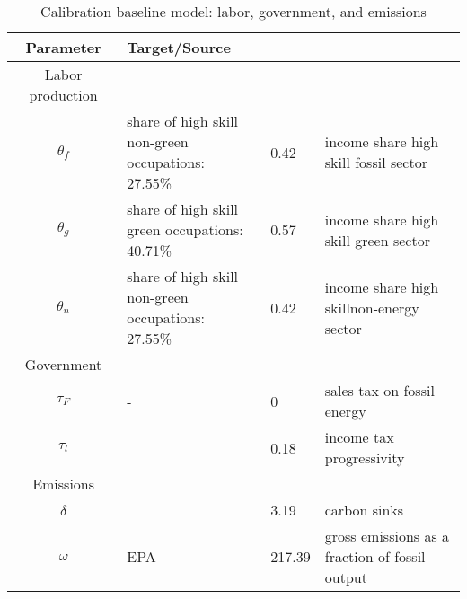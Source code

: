   \begin{table}[hh!!!!!]
  	\begin{center}
  		\captionsetup{width=0.9\textwidth}
  		\caption{ Calibration baseline model: labor, government, and emissions}
  		\label{tab:calib2}
  		\begin{tabular}{c|lll}
  			\hline \hline
  			Parameter& Target/Source& \makecell[l]{Calibration}& \makecell[l]{Meaning}\\ 
  			\hline
  			\hline
  			Labor production&\multicolumn{3}{c}{}\\
  			\hline 
  			
  			\hline
  			$\theta_f$&\makecell[l]{share of high skill\\ non-green occupations: \\27.55\% }&0.42&\makecell[l]{income share high \\ skill fossil sector}\\
  			\hline
  			$\theta_g$&\makecell[l]{share of high skill\\ green occupations: \\40.71\% }&0.57&\makecell[l]{income share high \\skill green sector}\\
  			\hline
  			$\theta_n$&\makecell[l]{share of high skill\\ non-green occupations: \\27.55\% }&0.42&\makecell[l]{income share high \\ skillnon-energy sector}\\
  			\hline
  			\hline
  			Government&\multicolumn{3}{c}{}\\
  			\hline
  			
  			\hline
  			$\tau_F$&- &0& sales tax on fossil energy\\
  			\hline
  			$\tau_l$&\cite{Heathcote2017OptimalFramework} &0.18& income tax progressivity\\
  			\hline	
  			\hline
  			Emissions&\multicolumn{3}{c}{}\\
  			\hline
  			
  			\hline
  			$\delta$& \makecell[l]{EPA}&3.19&carbon sinks \\
  			\hline
  			$\omega$& EPA&217.39& \makecell[l]{ gross emissions as a\\ fraction of fossil output}\\
  			\hline \hline
  		\end{tabular}
  	\end{center}
  \end{table}

